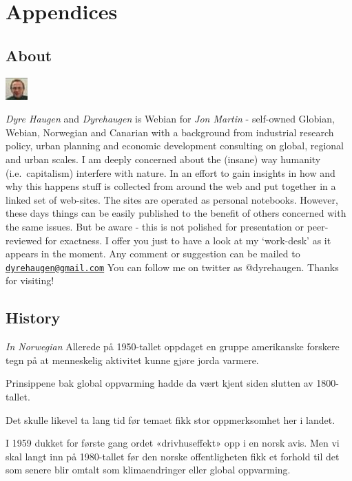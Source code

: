 \documentclass[
]{book}
\begin{document}
\hypertarget{part-appendices}{%
\part{Appendices}\label{part-appendices}}

\hypertarget{appendix-appendices}{%
\appendix}


\hypertarget{about}{%
\chapter{About}\label{about}}

\includegraphics{fig/me.jpg}

\emph{Dyre Haugen} and \emph{Dyrehaugen} is Webian for \emph{Jon Martin} -
self-owned Globian, Webian, Norwegian and Canarian with
a background from industrial research policy, urban planning and
economic development consulting on global, regional and urban scales.
I am deeply concerned about the (insane) way
humanity (i.e.~capitalism) interfere with nature.
In an effort to gain insights in how and why this happens
stuff is collected from around the web and put together
in a linked set of web-sites.
The sites are operated as personal notebooks.
However, these days things can be easily published to the
benefit of others concerned with the same issues.
But be aware - this is not polished for presentation or
peer-reviewed for exactness.
I offer you just to have a look at my `work-desk' as it appears in the moment.
Any comment or suggestion can be mailed to \href{mailto:dyrehaugen@gmail.com}{\nolinkurl{dyrehaugen@gmail.com}}
You can follow me on twitter as @dyrehaugen.
Thanks for visiting!

\hypertarget{history}{%
\chapter{History}\label{history}}

\emph{In Norwegian}
Allerede på 1950-tallet oppdaget en gruppe amerikanske forskere tegn på at menneskelig aktivitet kunne gjøre jorda varmere.

Prinsippene bak global oppvarming hadde da vært kjent siden slutten av 1800-tallet.

Det skulle likevel ta lang tid før temaet fikk stor oppmerksomhet her i landet.

I 1959 dukket for første gang ordet «drivhuseffekt» opp i en norsk avis. Men vi skal langt inn på 1980-tallet før den norske offentligheten fikk et forhold til det som senere blir omtalt som klimaendringer eller global oppvarming.
\end{document}

